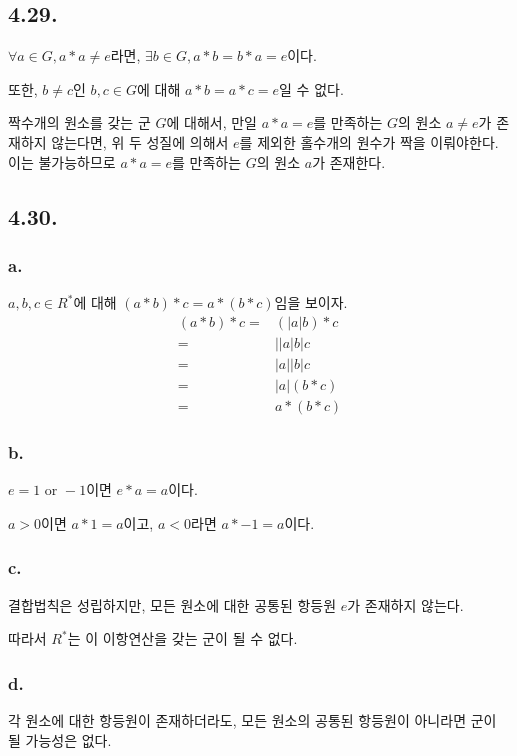\documentclass{article}
\begin{document}
\subsection{4.29.}
$\forall a \in G, a * a \neq e$라면, $\exists b \in G, a * b = b * a = e$이다.

또한, $b \neq c$인 $b, c \in G$에 대해 $a * b = a * c = e$일 수 없다.

짝수개의 원소를 갖는 군 $G$에 대해서, 만일 $a * a = e$를 만족하는 $G$의 원소 $a \neq e$가 존재하지 않는다면, 위 두 성질에 의해서 $e$를 제외한 홀수개의 원수가 짝을 이뤄야한다. 이는 불가능하므로 $a * a = e$를 만족하는 $G$의 원소 $a$가 존재한다.

\subsection{4.30.}
\subsubsection{a.}
$a, b, c \in R^*$에 대해 $(a * b) * c = a * (b * c)$임을 보이자.
\begin{align*}
(a * b) * c =& (|a|b) * c 
\\ =& \left| |a| b \right| c
\\ =& |a||b| c
\\ =& |a| (b * c)
\\ =& a * (b * c)
\end{align*}

\subsubsection{b.}
$e = 1 \text{ or } -1$이면 $e * a = a$이다.

$a > 0$이면 $a * 1 = a$이고, $a < 0$라면 $a * -1 = a$이다.

\subsubsection{c.}

결합법칙은 성립하지만, 모든 원소에 대한 공통된 항등원 $e$가 존재하지 않는다.

따라서 $R^*$는 이 이항연산을 갖는 군이 될 수 없다.

\subsubsection{d.}
각 원소에 대한 항등원이 존재하더라도, 모든 원소의 공통된 항등원이 아니라면 군이 될 가능성은 없다.
\end{document}
